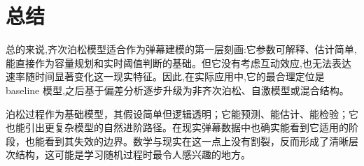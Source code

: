 \documentclass[12pt,a4paper]{article}
\begin{document}
\section{总结}

总的来说,齐次泊松模型适合作为弹幕建模的第一层刻画:它参数可解释、估计简单,能直接作为容量规划和实时阈值判断的基础。但它没有考虑互动效应,也无法表达速率随时间显著变化这一现实特征。因此,在实际应用中,它的最合理定位是 baseline 模型,之后基于偏差分析逐步升级为非齐次泊松、自激模型或混合结构。


泊松过程作为基础模型，其假设简单但逻辑透明；它能预测、能估计、能检验；它也能引出更复杂模型的自然进阶路径。在现实弹幕数据中也确实能看到它适用的阶段，也能看到其失效的边界。数学与现实在这一点上没有割裂，反而形成了清晰层次结构，这可能是学习随机过程时最令人感兴趣的地方。
\end{document}
